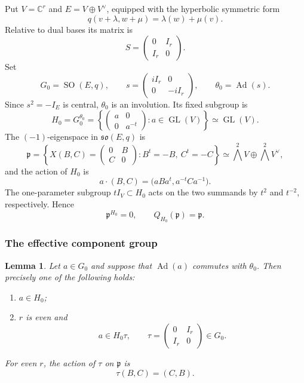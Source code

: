 \documentclass[11pt,reqno]{amsart}
\numberwithin{equation}{section}
\newtheorem{lemma}[theorem]{Lemma}
\theoremstyle{definition}
\theoremstyle{remark}
\newcommand{\C}{\mathbb C}
\newcommand{\SO}{\operatorname{SO}}
\newcommand{\GL}{\operatorname{GL}}
\newcommand{\Ad}{\operatorname{Ad}}
\newcommand{\fp}{\mathfrak p}
\newcommand{\wedgeTwo}{\bigwedge^{2}}
\begin{document}
Put $V=\C^r$ and $E=V\oplus V^\vee$, equipped with the hyperbolic symmetric form
\[
  q(v+\lambda,w+\mu)=\lambda(w)+\mu(v).
\]
Relative to dual bases its matrix is
\[
  S=\begin{pmatrix}0&I_r\\ I_r&0\end{pmatrix}.
\]
Set
\[
  G_0=\SO(E,q),\qquad
  s=\begin{pmatrix}iI_r&0\\0&-iI_r\end{pmatrix},\qquad
  \theta_0=\Ad(s).
\]
Since $s^2=-I_E$ is central, $\theta_0$ is an involution.  Its fixed subgroup is
\[
 H_0=G_0^{\theta_0}
 =\left\{\begin{pmatrix}a&0\\0&a^{-t}\end{pmatrix}:a\in\GL(V)\right\}
 \simeq\GL(V).
\]
The $(-1)$-eigenspace in $\mathfrak{so}(E,q)$ is
\begin{equation}\label{diii:eq:pmodel}
 \fp=
 \left\{
   X(B,C)=\begin{pmatrix}0&B\\ C&0\end{pmatrix}:
   B^t=-B,\ C^t=-C
 \right\}
 \simeq\wedgeTwo V\oplus\wedgeTwo V^\vee,
\end{equation}
and the action of $H_0$ is
\begin{equation}\label{diii:eq:Haction}
  a\cdot(B,C)=\bigl(aBa^t,a^{-t}Ca^{-1}\bigr).
\end{equation}
The one-parameter subgroup $tI_V\subset H_0$ acts on the two summands by
$t^2$ and $t^{-2}$, respectively.  Hence
\begin{equation}\label{diii:eq:no-fixed}
  \fp^{H_0}=0,
  \qquad Q_{H_0}(\fp)=\fp.
\end{equation}

\subsubsection{The effective component group}

\begin{lemma}\label{diii:lem:components-SO}
Let $a\in G_0$ and suppose that $\Ad(a)$ commutes with $\theta_0$.  Then precisely one of the following holds:
\begin{enumerate}[label=\textup{(\roman*)}]
  \item $a\in H_0$;
  \item $r$ is even and
  \[
    a\in H_0\tau,
    \qquad
    \tau=\begin{pmatrix}0&I_r\\ I_r&0\end{pmatrix}\in G_0.
  \]
\end{enumerate}
For even $r$, the action of $\tau$ on $\fp$ is
\begin{equation}\label{diii:eq:tauaction}
  \tau(B,C)=(C,B).
\end{equation}
\end{lemma}
\end{document}
